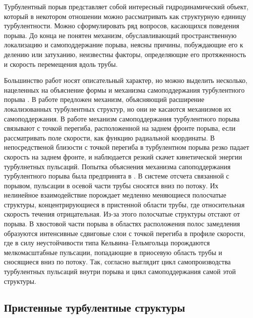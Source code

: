Турбулентный порыв представляет собой интересный гидродинамический объект, который в некотором отношении можно рассматривать как структурную единицу турбулентности. Можно сформулировать ряд вопросов, касающихся поведения порыва. До конца не понятен механизм, обуславливающий пространственную локализацию и самоподдержание порыва, неясны причины, побуждающие его к делению или затуханию, неизвестны факторы, определяющие его протяженность и скорость перемещения вдоль трубы.

Большинство работ носят описательный характер, но можно выделить несколько, нацеленных на объяснение формы и механизма самоподдержания турбулентного порыва \cite{Duguet2010, Hof2010, Shimizu2009}. В работе \cite{Duguet2010} предложен механизм, объясняющий расширение локализованных турбулентных структур, но они не касаются механизмов их самоподдержания. В работе \cite{Hof2010} механизм самоподдержания турбулентного порыва связывают с точкой перегиба, расположенной на заднем фронте порыва, если рассматривать поле скорости, как функцию радиальной координаты. В непосредственой близости с точкой перегиба в турбулентном порыва резко падает скорость на заднем фронте, и наблюдается резкий скачет кинетической энергии турбулнетных пульсаций. 
Попытка объяснения механизма сапоподдержания турбулентного порыва была предпринята в \cite{Shimizu2009}. В системе отсчета связанной с порывом, пульсации в осевой части трубы сносятся вниз по потоку. Их нелинейное взаимодействие порождает медленно меняющиеся полосчатые структуры, концентрирующиеся в пристенной области трубы, где относительная скорость течения отрицательная. Из-за этого полосчатые структуры отстают от порыва. В хвостовой части порыва в областях расположения полос замедления образуются интенсивные сдвиговые слои с точкой перегиба в профиле скорости, где в силу неустойчивости типа Кельвина--Гельмгольца порождаются мелкомасштабные пульсации, попадающие в приосевую область трубы и сносящиеся вниз по потоку. Так, согласно \cite{Shimizu2009} выглядит цикл самопроизводства турбулентных пульсаций внутри порыва и цикл самоподдержания самой этой структуры.


	\subsection{Пристенные турбулентные структуры} \label{structure_subsection}


